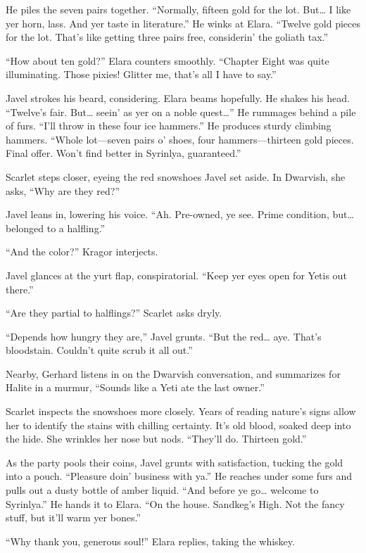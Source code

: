 \documentclass[
  letterpaper,12pt,twoside,twocolumn,openany,
  nodeprecatedcode,bg=full]{dndbook}
\begin{document}
He piles the seven pairs together. ``Normally, fifteen gold for the lot.
But\ldots{} I like yer horn, lass. And yer taste in literature.'' He
winks at Elara. ``Twelve gold pieces for the lot. That's like getting
three pairs free, considerin' the goliath tax.''

``How about ten gold?'' Elara counters smoothly. ``Chapter Eight was
quite illuminating. Those pixies! Glitter me, that's all I have to
say.''

Javel strokes his beard, considering. Elara beams hopefully. He shakes
his head. ``Twelve's fair. But\ldots{} seein' as yer on a noble
quest\ldots{}'' He rummages behind a pile of furs. ``I'll throw in these
four ice hammers.'' He produces sturdy climbing hammers. ``Whole
lot---seven pairs o' shoes, four hammers---thirteen gold pieces. Final
offer. Won't find better in Syrinlya, guaranteed.''

Scarlet steps closer, eyeing the red snowshoes Javel set aside. In
Dwarvish, she asks, ``Why are they red?''

Javel leans in, lowering his voice. ``Ah. Pre-owned, ye see. Prime
condition, but\ldots{} belonged to a halfling.''

``And the color?'' Kragor interjects.

Javel glances at the yurt flap, conspiratorial. ``Keep yer eyes open for
Yetis out there.''

``Are they partial to halflings?'' Scarlet asks dryly.

``Depends how hungry they are,'' Javel grunts. ``But the red\ldots{}
aye. That's bloodstain. Couldn't quite scrub it all out.''

Nearby, Gerhard listens in on the Dwarvish conversation, and summarizes
for Halite in a murmur, ``Sounds like a Yeti ate the last owner.''

Scarlet inspects the snowshoes more closely. Years of reading nature's
signs allow her to identify the stains with chilling certainty. It's old
blood, soaked deep into the hide. She wrinkles her nose but nods.
``They'll do. Thirteen gold.''

As the party pools their coins, Javel grunts with satisfaction, tucking
the gold into a pouch. ``Pleasure doin' business with ya.'' He reaches
under some furs and pulls out a dusty bottle of amber liquid. ``And
before ye go\ldots{} welcome to Syrinlya.'' He hands it to Elara. ``On
the house. Sandkeg's High. Not the fancy stuff, but it'll warm yer
bones.''

``Why thank you, generous soul!'' Elara replies, taking the whiskey.
\end{document}
